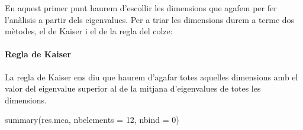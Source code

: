 \documentclass[
]{article}
\newenvironment{Shaded}{\begin{snugshade}}{\end{snugshade}}
\newcommand{\AttributeTok}[1]{\textcolor[rgb]{0.77,0.63,0.00}{#1}}
\newcommand{\DecValTok}[1]{\textcolor[rgb]{0.00,0.00,0.81}{#1}}
\newcommand{\FunctionTok}[1]{\textcolor[rgb]{0.00,0.00,0.00}{#1}}
\newcommand{\NormalTok}[1]{#1}
\begin{document}
En aquest primer punt haurem d'escollir les dimensions que agafem per
fer l'anàlisis a partir dels eigenvalues. Per a triar les dimensions
durem a terme dos mètodes, el de Kaiser i el de la regla del colze:

\hypertarget{regla-de-kaiser}{%
\paragraph{Regla de Kaiser}\label{regla-de-kaiser}}

La regla de Kaiser ens diu que haurem d'agafar totes aquelles dimensions
amb el valor del eigenvalue superior al de la mitjana d'eigenvalues de
totes les dimensions.

\begin{Shaded}
\begin{Highlighting}[]
\FunctionTok{summary}\NormalTok{(res.mca, }\AttributeTok{nbelements =} \DecValTok{12}\NormalTok{, }\AttributeTok{nbind =} \DecValTok{0}\NormalTok{)}
\end{Highlighting}
\end{Shaded}
\end{document}
